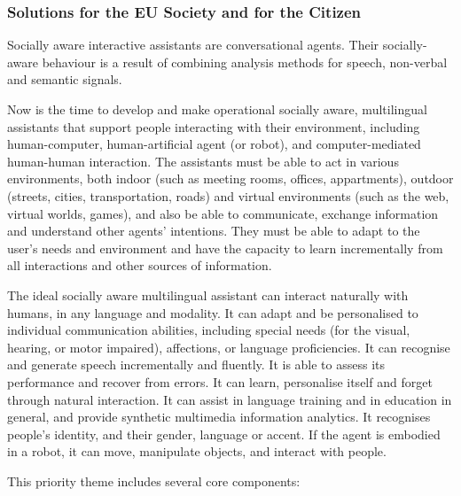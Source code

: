 \documentclass[10pt, plain]{../../metanetpaper}
\begin{document}
\begin{multicols}{2}
\subsubsection{Solutions for the EU Society and for the Citizen}
\label{sec:solutions-eu-society-pt3}

Socially aware interactive assistants are conversational agents. Their socially-aware behaviour is a result of combining analysis methods for speech, non-verbal and semantic signals.

Now is the time to develop and make operational socially aware, multilingual assistants that support people interacting with their environment, including human-computer, human-artificial agent (or robot), and computer-mediated human-human interaction. The assistants must be able to act in various environments, both indoor (such as meeting rooms, offices, appartments), outdoor (streets, cities, transportation, roads) and virtual environments (such as the web, virtual worlds, games), and also be able to communicate, exchange information and understand other agents’ intentions. They must be able to adapt to the user’s needs and environment and have the capacity to learn incrementally from all interactions and other sources of information.
 
The ideal socially aware multilingual assistant can interact naturally with humans, in any language and modality. It can adapt and be personalised to individual communication abilities, including special needs (for the visual, hearing, or motor impaired), affections, or language proficiencies. It can recognise and generate speech incrementally and fluently. It is able to assess its performance and recover from errors. It can learn, personalise itself and forget through natural interaction. It can assist in language training and in education in general, and provide synthetic multimedia information analytics. It recognises people’s identity, and their gender, language or accent. If the agent is embodied in a robot, it can move, manipulate objects, and interact with people.

This priority theme includes several core components:


\end{multicols}
\end{document}
